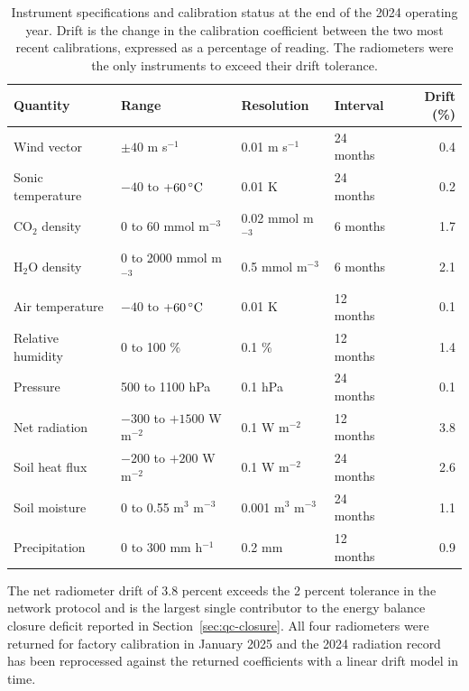 \begin{table}[t]
\centering
\small
\caption{Instrument specifications and calibration status at the end of the
2024 operating year. Drift is the change in the calibration coefficient between
the two most recent calibrations, expressed as a percentage of reading. The
radiometers were the only instruments to exceed their drift tolerance.}
\label{tab:instrument-specs}
\begin{tabular}{llllr}
\toprule
Quantity & Range & Resolution & Interval & Drift (\%) \\
\midrule
Wind vector        & $\pm 40$ m s$^{-1}$ & 0.01 m s$^{-1}$ & 24 months & 0.4 \\
Sonic temperature  & $-40$ to $+60\,^{\circ}\mathrm{C}$ & 0.01 K & 24 months & 0.2 \\
CO$_2$ density     & 0 to 60 mmol m$^{-3}$ & 0.02 mmol m$^{-3}$ & 6 months & 1.7 \\
H$_2$O density     & 0 to 2000 mmol m$^{-3}$ & 0.5 mmol m$^{-3}$ & 6 months & 2.1 \\
Air temperature    & $-40$ to $+60\,^{\circ}\mathrm{C}$ & 0.01 K & 12 months & 0.1 \\
Relative humidity  & 0 to 100 \% & 0.1 \% & 12 months & 1.4 \\
Pressure           & 500 to 1100 hPa & 0.1 hPa & 24 months & 0.1 \\
Net radiation      & $-300$ to $+1500$ W m$^{-2}$ & 0.1 W m$^{-2}$ & 12 months & 3.8 \\
Soil heat flux     & $-200$ to $+200$ W m$^{-2}$ & 0.1 W m$^{-2}$ & 24 months & 2.6 \\
Soil moisture      & 0 to 0.55 m$^{3}$ m$^{-3}$ & 0.001 m$^{3}$ m$^{-3}$ & 24 months & 1.1 \\
Precipitation      & 0 to 300 mm h$^{-1}$ & 0.2 mm & 12 months & 0.9 \\
\bottomrule
\end{tabular}
\end{table}

The net radiometer drift of 3.8 percent exceeds the 2 percent tolerance in the
network protocol \citep{ibls2022protocol} and is the largest single contributor to the energy balance
closure deficit reported in Section~\ref{sec:qc-closure}. All four radiometers
were returned for factory calibration in January 2025 and the 2024 radiation
record has been reprocessed against the returned coefficients with a linear
drift model in time.
